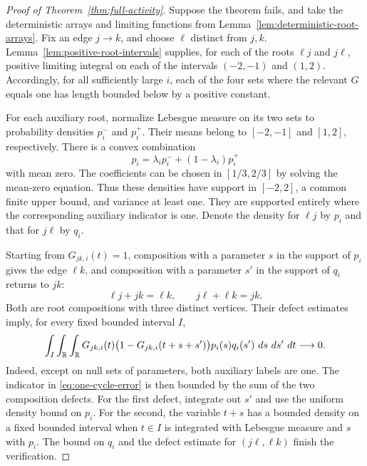 \begin{proof}[Proof of Theorem~\ref{thm:full-activity}]
Suppose the theorem fails, and take the deterministic arrays and limiting
functions from Lemma~\ref{lem:deterministic-root-arrays}.  Fix an edge
$j\to k$, and choose $\ell$ distinct from $j,k$.
Lemma~\ref{lem:positive-root-intervals} supplies, for each of the roots
$\ell j$ and $j\ell$, positive limiting integral on each of the
intervals $(-2,-1)$ and $(1,2)$.  Accordingly, for all sufficiently
large $i$, each of the four sets where the relevant $G$ equals one
has length bounded below by a positive constant.

For each auxiliary root, normalize Lebesgue measure on its two sets
to probability densities $p_i^-$ and $p_i^+$.  Their means belong to
$[-2,-1]$ and $[1,2]$, respectively.  There is a convex combination
\[
 p_i=\lambda_i p_i^-+(1-\lambda_i)p_i^+
\]
with mean zero.  The coefficients can be chosen in $[1/3,2/3]$ by
solving the mean-zero equation.  Thus these densities have support in
$[-2,2]$, a common finite upper bound, and variance at least one.
They are supported entirely where the corresponding auxiliary
indicator is one.  Denote the density for $\ell j$ by $p_i$ and that
for $j\ell$ by $q_i$.

Starting from $G_{jk,i}(t)=1$, composition with a parameter $s$ in the
support of $p_i$ gives the edge $\ell k$, and composition with a
parameter $s'$ in the support of $q_i$ returns to $jk$:
\[
 \ell j+jk=\ell k,\qquad j\ell+\ell k=jk.
\]
Both are root compositions with three distinct vertices.  Their defect
estimates imply, for every fixed bounded interval $I$,
\begin{equation}\label{eq:one-cycle-error}
 \int_I\int_\mathbb R\int_\mathbb R
 G_{jk,i}(t)\bigl(1-G_{jk,i}(t+s+s')\bigr)
 p_i(s)q_i(s')\,\mathop{}\!d s\,\mathop{}\!d s'\,\mathop{}\!d t\longrightarrow0.
\end{equation}
Indeed, except on null sets of parameters, both auxiliary labels are
one.  The indicator in \eqref{eq:one-cycle-error} is then bounded by
the sum of the two composition defects.  For the first defect,
integrate out $s'$ and use the uniform density bound on $p_i$.
For the second, the variable $t+s$ has a bounded density on a fixed
bounded interval when $t\in I$ is integrated with Lebesgue measure
and $s$ with $p_i$.  The bound on $q_i$ and the defect estimate for
$(j\ell,\ell k)$ finish the verification.


\end{proof}

